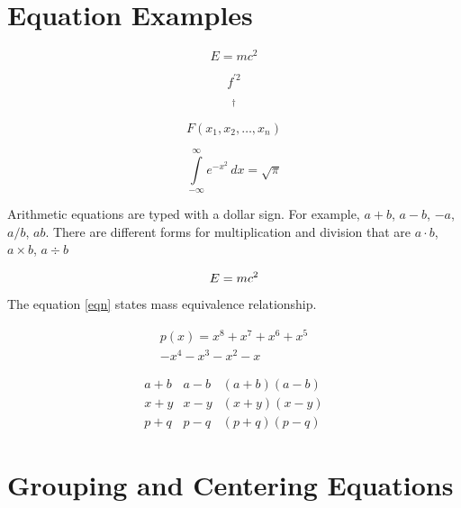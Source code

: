 \documentclass[]{article}
\title{}
\author{}
\begin{document}
\maketitle

\begin{abstract}

\end{abstract}

\section{Equation Examples}



\huge{
	\[ E = mc^2  \]
}

\[ f^{\prime 2} \]

\[ {}^{\dagger} \]

\[ F(x_{1}, x_{2}, \dots, x_{n})  \]

\[ \int\limits_{-\infty}^{\infty} e^{-x^{2}} \, dx = \sqrt{\pi} \]





Arithmetic equations are typed with a dollar sign. For example, $a + b$, $a - b$, $-a$, $a / b$, $a b$. There are different forms for multiplication and division that are $a \cdot b$, $a \times b$, $a \div b$



\begin{equation} \label{eqn}
	\huge{E = {mc^2}}
\end{equation}

The equation \ref{eqn} states mass equivalence relationship.



\newpage



\begin{multline*}
	p(x) = x^8+x^7+x^6+x^5 \\ 
	- x^4 - x^3 - x^2 - x
\end{multline*}





\begin{align*}
	a+b        &     a-b              &  (a+b)(a-b)\\
	x+y         &  x-y   &  (x+y)(x-y)\\
	p+q   &  p-q          &  (p+q)(p-q)
\end{align*}



\section{Grouping and Centering Equations}
\end{document}
